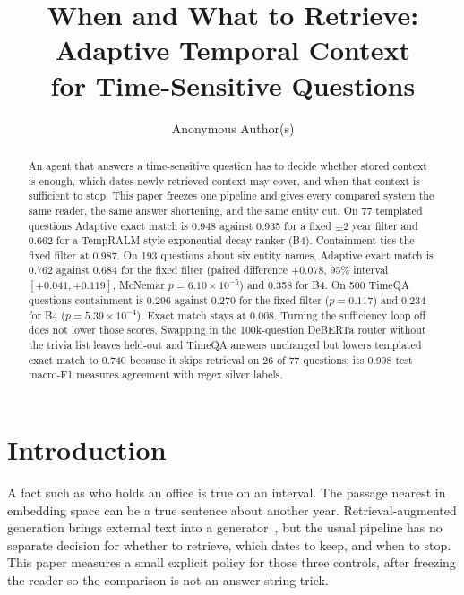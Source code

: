 \documentclass[sigconf,anonymous,review]{acmart}
\begin{document}
\title{When and What to Retrieve:\\Adaptive Temporal Context\\for Time-Sensitive Questions}

\author{Anonymous Author(s)}
\renewcommand{\shortauthors}{Anonymous Author(s)}

\begin{abstract}
An agent that answers a time-sensitive question has to decide whether stored context is enough, which dates newly retrieved context may cover, and when that context is sufficient to stop.
This paper freezes one pipeline and gives every compared system the same reader, the same answer shortening, and the same entity cut.
On 77 templated questions Adaptive exact match is 0.948 against 0.935 for a fixed $\pm 2$ year filter and 0.662 for a TempRALM-style exponential decay ranker (B4).
Containment ties the fixed filter at 0.987.
On 193 questions about six entity names, Adaptive exact match is 0.762 against 0.684 for the fixed filter (paired difference $+0.078$, 95\% interval $[+0.041,+0.119]$, McNemar $p=6.10\times 10^{-5}$) and 0.358 for B4.
On 500 TimeQA questions containment is 0.296 against 0.270 for the fixed filter ($p=0.117$) and 0.234 for B4 ($p=5.39\times 10^{-4}$).
Exact match stays at 0.008.
Turning the sufficiency loop off does not lower those scores.
Swapping in the 100k-question DeBERTa router without the trivia list leaves held-out and TimeQA answers unchanged but lowers templated exact match to 0.740 because it skips retrieval on 26 of 77 questions; its 0.998 test macro-F1 measures agreement with regex silver labels.
\end{abstract}


\maketitle

\section{Introduction}

A fact such as who holds an office is true on an interval.
The passage nearest in embedding space can be a true sentence about another year.
Retrieval-augmented generation brings external text into a generator~\cite{lewis2020rag}, but the usual pipeline has no separate decision for whether to retrieve, which dates to keep, and when to stop.
This paper measures a small explicit policy for those three controls, after freezing the reader so the comparison is not an answer-string trick.
\end{document}
